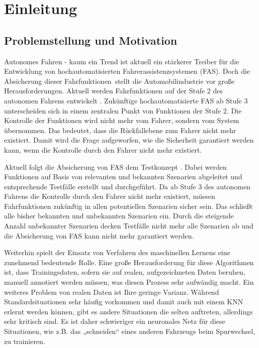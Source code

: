 
\chapter{Einleitung}
\label{einleitung}


\section{Problemstellung und Motivation}
\label{einleitung_problemstellung}

Autonomes Fahren - kaum ein Trend ist aktuell ein stärkerer Treiber für die Entwicklung von hochautomatisierten Fahrerassistenzsystemen (\acs{FAS}). Doch die Absicherung dieser Fahrfunktionen stellt die Automobilindustrie vor große Herausforderungen. Aktuell werden Fahrfunktionen auf der Stufe 2 des autonomen Fahrens entwickelt \cite{sae2014taxonomy}. Zukünftige hochautomatisierte \ac{FAS} ab Stufe 3 unterscheiden sich in einem zentralen Punkt von Funktionen der Stufe 2. Die Kontrolle der Funktionen wird nicht mehr vom Fahrer, sondern vom System übernommen. Das bedeutet, dass die Rückfallebene zum Fahrer nicht mehr existiert. Damit wird die Frage aufgeworfen, wie die Sicherheit garantiert werden kann, wenn die Kontrolle durch den Fahrer nicht mehr existiert.

Aktuell folgt die Absicherung von \ac{FAS} dem Testkonzept \cite{schuldt2013effiziente}. Dabei werden Funktionen auf Basis von relevanten und bekannten Szenarien abgeleitet und entsprechende Testfälle erstellt und durchgeführt. Da ab Stufe 3 des autonomen Fahrens die Kontrolle durch den Fahrer nicht mehr existiert, müssen Fahrfunktionen zukünftig in allen potentiellen Szenarien sicher sein. Das schließt alle bisher bekannten und unbekannten Szenarien ein. Durch die steigende Anzahl unbekannter Szenarien decken Testfälle nicht mehr alle Szenarien ab und die Absicherung von \ac{FAS} kann nicht mehr garantiert werden.

Weiterhin spielt der Einsatz von Verfahren des maschinellen Lernens eine zunehmend bedeutende Rolle. Eine große Herausforderung für diese Algorithmen ist, dass Trainingsdaten, sofern sie auf realen, aufgezeichneten Daten beruhen, manuell annotiert werden müssen, was diesen Prozess sehr aufwändig macht. Ein weiteres Problem von realen Daten ist Ihre geringe Varianz. Während Standardsituationen sehr häufig vorkommen und damit auch mit einem \ac{KNN} erlernt werden können, gibt es andere Situationen die selten auftreten, allerdings sehr kritisch sind. Es ist daher schwieriger ein neuronales Netz für diese Situationen, wie z.B. das „schneiden“ eines anderen Fahrzeugs beim Spurwechsel, zu trainieren.

